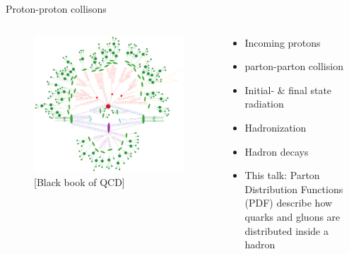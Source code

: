 \documentclass[8pt,t]{beamer}
\begin{document}
\begin{frame}{Proton-proton collisons}
  \begin{columns}
    \begin{column}{0.5\textwidth}
        \begin{figure}
          \includegraphics[width=0.99\textwidth]{proton_proton_diagram.png}
          \caption*{\color{gray}\footnotesize [Black book of QCD]}
        \end{figure}
      \end{column}
    \begin{column}{0.5\textwidth}
    \vspace*{2em}
      \begin{itemize}
        \item Incoming protons
        \item parton-parton collision
        \item Initial- \& final state radiation
        \item Hadronization
        \item Hadron decays
      \end{itemize}

      \begin{itemize}
        \item This talk: Parton Distribution Functions (PDF) describe how quarks and gluons are distributed inside a hadron
      \end{itemize}
    \end{column}
  \end{columns}

\end{frame}
\end{document}
